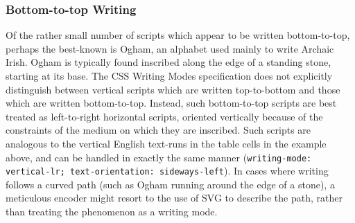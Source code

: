 \subsubsection[{Bottom-to-top Writing}]{Bottom-to-top Writing}\label{WDWMEG4}\par
Of the rather small number of scripts which appear to be written bottom-to-top, perhaps the best-known is Ogham, an alphabet used mainly to write Archaic Irish. Ogham is typically found inscribed along the edge of a standing stone, starting at its base. The CSS Writing Modes specification does not explicitly distinguish between vertical scripts which are written top-to-bottom and those which are written bottom-to-top. Instead, such bottom-to-top scripts are best treated as left-to-right horizontal scripts, oriented vertically because of the constraints of the medium on which they are inscribed. Such scripts are analogous to the vertical English text-runs in the table cells in the example above, and can be handled in exactly the same manner (\texttt{writing-mode: vertical-lr; text-orientation: sideways-left}). In cases where writing follows a curved path (such as Ogham running around the edge of a stone), a meticulous encoder might resort to the use of SVG to describe the path, rather than treating the phenomenon as a writing mode.
